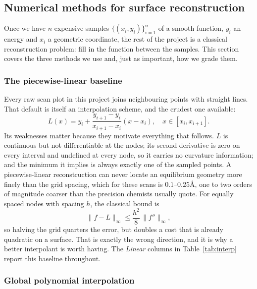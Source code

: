 \documentclass[sigconf,screen,nonacm]{acmart}
\newcommand{\Ang}{\text{\AA}}
\begin{document}
\subsection{Numerical methods for surface reconstruction}
\label{sec:numerics}
Once we have $n$ expensive samples $\{(x_i, y_i)\}_{i=1}^{n}$ of a smooth
function, $y_i$ an energy and $x_i$ a geometric coordinate, the rest of the
project is a classical reconstruction problem: fill in the function between
the samples. This section covers the three methods we use and, just as
important, how we grade them.

\subsubsection{The piecewise-linear baseline}

Every raw scan plot in this project joins neighbouring points with straight
lines. That default is itself an interpolation scheme, and the crudest one
available:
\begin{equation}
L(x) = y_i + \frac{y_{i+1}-y_i}{x_{i+1}-x_i}(x - x_i),
\quad x \in [x_i, x_{i+1}].
\end{equation}
Its weaknesses matter because they motivate everything that follows. $L$ is
continuous but not differentiable at the nodes; its second derivative is
zero on every interval and undefined at every node, so it carries no
curvature information; and the minimum it implies is always exactly one of
the sampled points. A piecewise-linear reconstruction can never locate an
equilibrium geometry more finely than the grid spacing, which for these scans
is $0.1$--$0.25\Ang$, one to two orders of magnitude coarser than the
precision chemists usually quote. For equally spaced nodes with spacing $h$,
the classical bound is
\begin{equation}
\|f - L\|_\infty \leq \frac{h^2}{8}\,\|f''\|_\infty ,
\label{eq:linbound}
\end{equation}
so halving the grid quarters the error, but doubles a cost that is already
quadratic on a surface. That is exactly the wrong direction, and it is why a
better interpolant is worth having. The \emph{Linear} columns in
Table~\ref{tab:interp} report this baseline throughout.

\subsubsection{Global polynomial interpolation}
\end{document}
